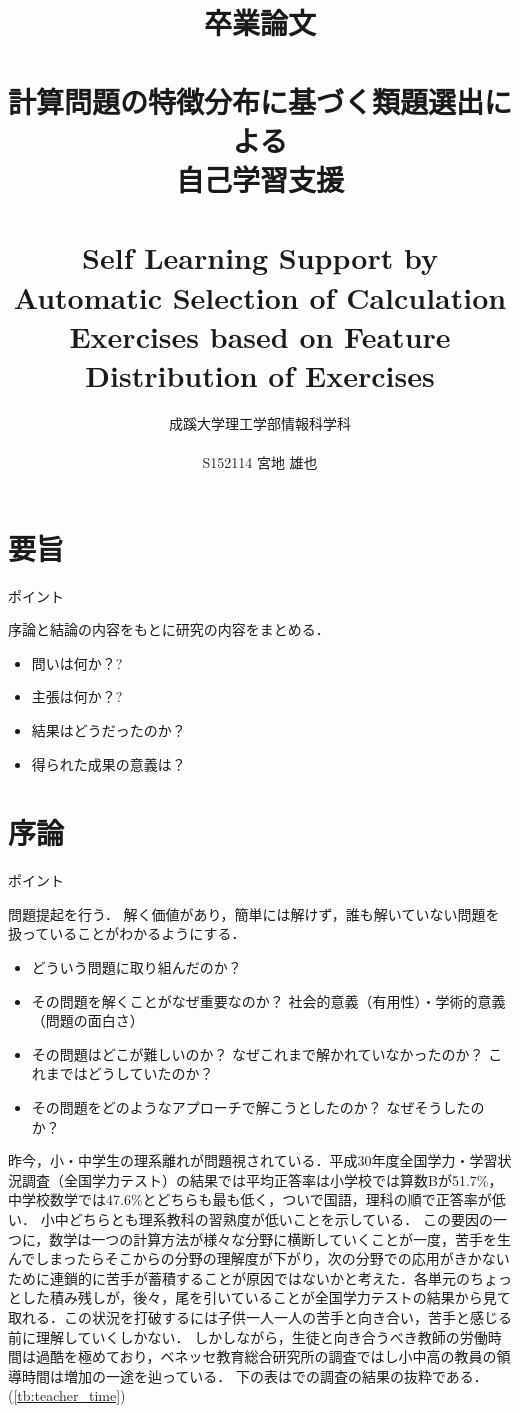 \documentclass[a4j,11pt,report]{jsbook}
\title{卒業論文\\ \vspace{3em}\\{\huge #1}\\ \\#2\vspace{15em}}%
\author{{\huge 成蹊大学理工学部情報科学科}\\ \\{\huge #3}}%
\date{}
\newcommand{\frontpage}[3]{%
\title{卒業論文\\ \vspace{3em}\\{\huge #1}\\ \\#2\vspace{15em}}%
\author{{\huge 成蹊大学理工学部情報科学科}\\ \\{\huge #3}}%
\date{}
\maketitle
\clearpage
\thispagestyle{empty}

\clearpage
}
\newcommand{\point}[1]{
\begin{itembox}[l]{ポイント}
  #1
\end{itembox}
}
\begin{document}
\frontpage  %
{計算問題の特徴分布に基づく類題選出による\\自己学習支援}
{Self Learning Support by Automatic Selection of Calculation Exercises based on Feature Distribution of Exercises}
{S152114 宮地 雄也}

\chapter*{要旨}
\thispagestyle{empty}
\point{
序論と結論の内容をもとに研究の内容をまとめる．
\begin{itemize}
  \item 問いは何か？?
  \item 主張は何か？?
  \item 結果はどうだったのか？
  \item 得られた成果の意義は？
\end{itemize}
}

\tableofcontents
\thispagestyle{empty}
\clearpage
\thispagestyle{plain}
\setcounter{page}{1}

\chapter{序論 \label{ch:introduction}}

\point{
問題提起を行う．
解く価値があり，簡単には解けず，誰も解いていない問題を扱っていることがわかるようにする．
\begin{itemize}
  \item どういう問題に取り組んだのか？
  \item その問題を解くことがなぜ重要なのか？ 社会的意義（有用性）・学術的意義（問題の面白さ）
  \item その問題はどこが難しいのか？ なぜこれまで解かれていなかったのか？ これまではどうしていたのか？
  \item その問題をどのようなアプローチで解こうとしたのか？ なぜそうしたのか？
\end{itemize}
}

昨今，小・中学生の理系離れが問題視されている．平成30年度全国学力・学習状況調査（全国学力テスト）の結果では平均正答率は小学校では算数Bが51.7\%，中学校数学では47.6\%とどちらも最も低く，ついで国語，理科の順で正答率が低い．
小中どちらとも理系教科の習熟度が低いことを示している．
この要因の一つに，数学は一つの計算方法が様々な分野に横断していくことが一度，苦手を生んでしまったらそこからの分野の理解度が下がり，次の分野での応用がきかないために連鎖的に苦手が蓄積することが原因ではないかと考えた．各単元のちょっとした積み残しが，後々，尾を引いていることが全国学力テストの結果から見て取れる．この状況を打破するには子供一人一人の苦手と向き合い，苦手と感じる前に理解していくしかない．
しかしながら，生徒と向き合うべき教師の労働時間は過酷を極めており，ベネッセ教育総合研究所の調査ではし小中高の教員の領導時間は増加の一途を辿っている．\cite{benesse_DateBook}
下の表は\cite{benesse_DateBook}での調査の結果の抜粋である．(\ref{tb:teacher_time})
\end{document}
